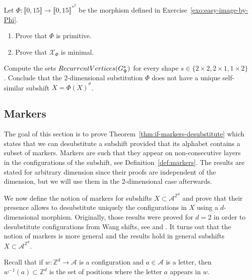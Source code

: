 \documentclass[12pt]{amsart}
\newcommand{\Z}{\mathbb{Z}}
\newcommand{\Acal}{\mathcal{A}} %
\newcommand{\Xcal}{\mathcal{X}} %
\newcommand{\shiftclosure}[1]{{\overline{#1}^{\sigma}}}
\newcommand{\Zrange}[1]{\llbracket0,#1\rrbracket}
\newcommand{\RecurrentVertices}{\textsc{RecurrentVertices}}
\begin{document}
\begin{exo}[label={exo:prove-primitive-minimal}]
Let $\Phi:\Zrange{15}\to\Zrange{15}^{*^2}$
be the morphism defined in Exercise~\ref{exo:easy-image-by-Phi}.
    \begin{enumerate}%
        \item Prove that $\Phi$ is primitive.
        \item Prove that $\Xcal_\Phi$ is minimal.
    \end{enumerate}
\end{exo}


\begin{exo}[label={exo:recurrent-vertices}]
    Compute the sets
    $\RecurrentVertices(G^s_\Phi)$
    for every shape $s\in\{2\times2, 2\times1, 1\times2\}$.
    Conclude that the 2-dimensional substitution $\Phi$ does not have 
    a unique self-similar subshift $X=\shiftclosure{\Phi(X)}$.
\end{exo}


%
%

\subsection{Markers}\label{subsection:markers}

The goal of this section is to prove Theorem~\ref{thm:if-markers-desubstitute}
which states that we can desubstitute a subshift provided that its alphabet
contains a subset of markers.
Markers are such that they appear on non-consecutive layers in the
configurations of the subshift, see Definition~\ref{def:markers}.
The results are stated for arbitrary dimension since their proofs are
independent of the dimension, but we will use them in the 2-dimensional case
afterwards.


We now define the notion of markers for subshifts $X\subset\Acal^{\Z^d}$
and prove that their presence allows to desubstitute uniquely the configurations in $X$ 
using a $d$-dimensional morphism.
Originally, those results were proved for $d=2$ in order
to desubstitute configurations from Wang shifts, see
\cite{MR3978536} and \cite{MR4226493}.
It turns out that the notion of markers is more general and the results hold in general subshifts 
$X\subset\Acal^{\Z^d}$.

Recall that if $w:\Z^d\to\Acal$ is a configuration and $a\in\Acal$ is a letter, then
$w^{-1}(a)\subset\Z^d$ is the set of positions where the letter $a$ appears in
$w$.
\end{document}
